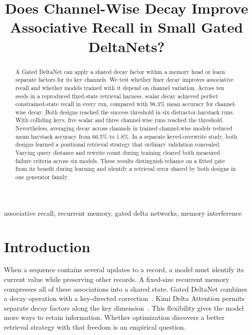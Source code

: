 \documentclass[conference]{IEEEtran}
\begin{document}
\title{Does Channel-Wise Decay Improve Associative Recall in Small Gated DeltaNets?}
\author{
}
\maketitle
\begin{abstract}
A Gated DeltaNet can apply a shared decay factor within a memory head or learn separate factors for its key channels. We test whether finer decay improves associative recall and whether models trained with it depend on channel variation. Across ten seeds in a reproduced fixed-state retrieval harness, scalar decay achieved perfect constrained-state recall in every run, compared with 98.3\% mean accuracy for channel-wise decay. Both designs reached the success threshold in six distractor-haystack runs. With colliding keys, five scalar and three channel-wise runs reached the threshold. Nevertheless, averaging decay across channels in trained channel-wise models reduced mean haystack accuracy from 66.5\% to 1.8\%. In a separate keyed-overwrite study, both designs learned a positional retrieval strategy that ordinary validation concealed. Varying query distance and rewrite count during training cleared both measured failure criteria across six models. These results distinguish reliance on a fitted gate from its benefit during learning and identify a retrieval error shared by both designs in one generator family.
\end{abstract}
\begin{IEEEkeywords}associative recall, recurrent memory, gated delta networks, memory interference\end{IEEEkeywords}
\section{Introduction}
When a sequence contains several updates to a record, a model must identify its current value while preserving other records. A fixed-size recurrent memory compresses all of these associations into a shared state. Gated DeltaNet combines a decay operation with a key-directed correction~\cite{gdn}. Kimi Delta Attention permits separate decay factors along the key dimension~\cite{kimi}. This flexibility gives the model more ways to retain information. Whether optimization discovers a better retrieval strategy with that freedom is an empirical question.
\end{document}
